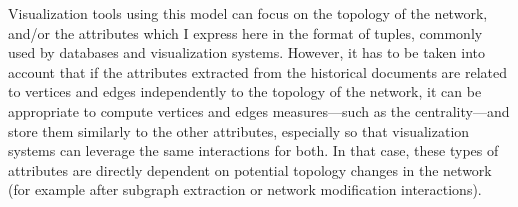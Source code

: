 Visualization tools using this model can focus on the topology of the network, and/or the attributes which I express here in the format of tuples, commonly used by databases and visualization systems\cite{stoltePolarisSystemQuery2002}.
However, it has to be taken into account that if the attributes extracted from the historical documents are related to vertices and edges independently to the topology of the network, it can be appropriate to compute vertices and edges measures---such as the centrality---and store them similarly to the other attributes, especially so that visualization systems can leverage the same interactions for both.
In that case, these types of attributes are directly dependent on potential topology changes in the network (for example after subgraph extraction or network modification interactions).









